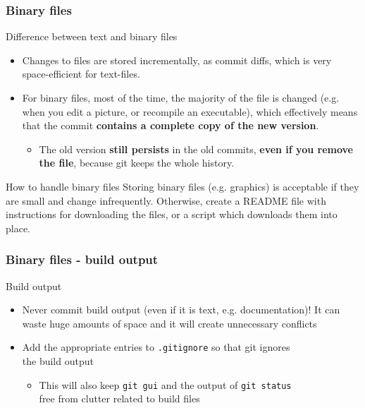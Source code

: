 \begin{frame}
	\frametitle{Binary files}
	
	\begin{block}{Difference between text and binary files}
	\begin{itemize}
	\item Changes to files are stored incrementally, as commit diffs, which is very space-efficient for text-files.
    \item For binary files, most of the time, the majority of the file is changed (e.g. when you edit a picture, or recompile an executable), which effectively means that the commit \textbf{contains a complete copy of the new version}.
    \begin{itemize}
    \item The old version \textbf{still persists} in the old commits, \textbf{even if you remove the file}, because git keeps the whole history.
    \end{itemize}
    \end{itemize}
	\end{block}
	
	\begin{block}{How to handle binary files}
	Storing binary files (e.g. graphics) is acceptable if they are small and change infrequently. Otherwise, create a README file with instructions for downloading the files, or a script which downloads them into place.
	\end{block}
\end{frame}


\begin{frame}[fragile]
	\frametitle{Binary files - build output}
	
	\begin{block}{Build output}
	\begin{itemize}
	\item \alert{Never} commit build output (even if it is text, e.g. documentation)! It can waste \alert{huge} amounts of space and it will create unnecessary conflicts
	\item Add the appropriate entries to \texttt{.gitignore} so that git ignores \\ the build output
	\begin{itemize}
	\item This will also keep \texttt{git gui} and the output of \texttt{git status}\\ free from clutter related to build files
	\end{itemize}
	\end{itemize}
	\end{block}
\end{frame}